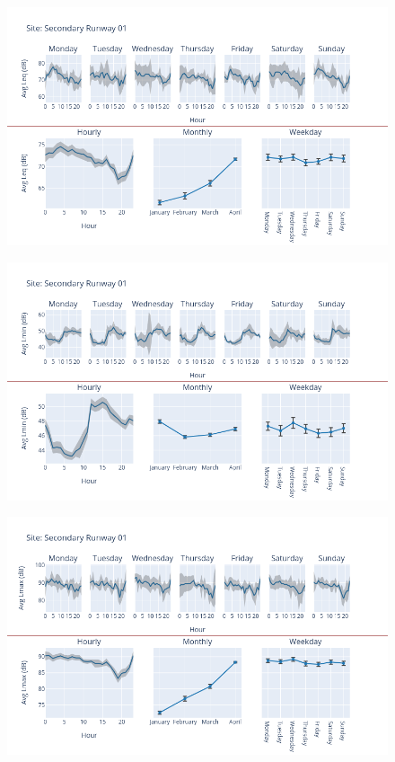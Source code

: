 \documentclass[12pt, oneside]{book}
\begin{document}
{ 
{\begin{figure}[H] 
 \centering 
\includegraphics[width=.88\textwidth, keepaspectratio]{image167} 
 \end{figure}}{} 

{\begin{figure}[H] 
 \centering 
\includegraphics[width=.88\textwidth, keepaspectratio]{image168} 
 \end{figure}}{} 

{\begin{figure}[H] 
 \centering 
\includegraphics[width=.88\textwidth, keepaspectratio]{image169} 
 \end{figure}}{} 

}
\end{document}
